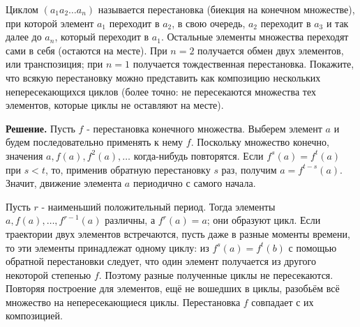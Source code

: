 \begin{problems}
\item Циклом $(a_1a_2\ldots a_n)$ называется перестановка (биекция на конечном множестве), при которой элемент $a_1$ переходит в $a_2$, в свою очередь, $a_2$ переходит в $a_3$ и так далее до $a_n$, который переходит в $a_1$. Остальные элементы множества переходят сами в себя (остаются на месте). При $n=2$ получается обмен двух элементов, или транспозиция; при $n=1$ получается тождественная перестановка. Покажите, что всякую перестановку можно представить как композицию нескольких непересекающихся циклов (более точно: не пересекаются множества тех элементов, которые циклы не оставляют на месте).
\par\smallskip\noindent\textbf{Решение.} Пусть $f$ - перестановка конечного множества. Выберем элемент $a$ и будем последовательно применять к нему $f$. Поскольку множество конечно, значения $a,f(a),f^2(a),\ldots$ когда-нибудь повторятся. Если $f^s(a)=f^t(a)$ при $s<t$, то, применив обратную перестановку $s$ раз, получим $a=f^{t-s}(a)$. Значит, движение элемента $a$ периодично с самого начала.
\par Пусть $r$ - наименьший положительный период. Тогда элементы $a,f(a),\ldots,f^{r-1}(a)$ различны, а $f^r(a)=a$; они образуют цикл. Если траектории двух элементов встречаются, пусть даже в разные моменты времени, то эти элементы принадлежат одному циклу: из $f^s(a)=f^t(b)$ с помощью обратной перестановки следует, что один элемент получается из другого некоторой степенью $f$. Поэтому разные полученные циклы не пересекаются. Повторяя построение для элементов, ещё не вошедших в циклы, разобьём всё множество на непересекающиеся циклы. Перестановка $f$ совпадает с их композицией.\par


\end{problems}
